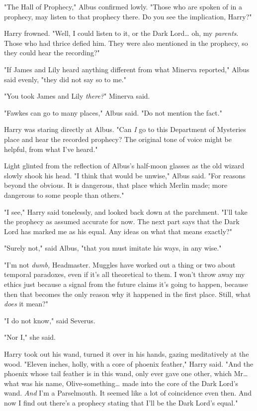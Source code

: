 "The Hall of Prophecy," Albus confirmed lowly. "Those who are spoken of in a 
prophecy, may listen to that prophecy there. Do you see the implication, Harry?"

Harry frowned. "Well, I could listen to it, or the Dark Lord{\ldots} oh, my 
\emph{parents}. Those who had thrice defied him. They were also mentioned in 
the prophecy, so they could hear the recording?"

"If James and Lily heard anything different from what Minerva reported," Albus 
said evenly, "they did not say so to me."

"You took James and Lily \emph{there?}" Minerva said.

"Fawkes can go to many places," Albus said. "Do not mention the fact."

Harry was staring directly at Albus. "Can \emph{I} go to this Department of 
Mysteries place and hear the recorded prophecy? The original tone of voice 
might be helpful, from what I've heard."

Light glinted from the reflection of Albus's half-moon glasses as the old 
wizard slowly shook his head. "I think that would be unwise," Albus said. "For 
reasons beyond the obvious. It is dangerous, that place which Merlin made; more 
dangerous to some people than others."

"I see," Harry said tonelessly, and looked back down at the parchment. "I'll 
take the prophecy as assumed accurate for now. The next part says that the Dark 
Lord has marked me as his equal. Any ideas on what that means exactly?"

"Surely not," said Albus, "that you must imitate his ways, in any wise."

"I'm not \emph{dumb,} Headmaster. Muggles have worked out a thing or two about 
temporal paradoxes, even if it's all theoretical to them. I won't throw away my 
ethics just because a signal from the future claims it's going to happen, 
because then that becomes the only reason why it happened in the first place. 
Still, what \emph{does} it mean?"

"I do not know," said Severus.

"Nor I," she said.

Harry took out his wand, turned it over in his hands, gazing meditatively at 
the wood. "Eleven inches, holly, with a core of phoenix feather," Harry said. 
"And the phoenix whose tail feather is in this wand, only ever gave one other, 
which Mr{\ldots} what was his name, Olive-something{\ldots} made into the core 
of the Dark Lord's wand. \emph{And} I'm a Parselmouth. It seemed like a lot of 
coincidence even then. And now I find out there's a prophecy stating that I'll 
be the Dark Lord's equal."


